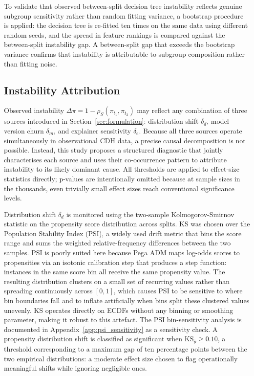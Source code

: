 \documentclass[oneside]{memoir} %
\begin{document}
To validate that observed between-split decision tree instability reflects genuine subgroup sensitivity rather than random fitting variance, a bootstrap procedure is applied: the decision tree is re-fitted ten times on the same data using different random seeds, and the spread in feature rankings is compared against the between-split instability gap. A between-split gap that exceeds the bootstrap variance confirms that instability is attributable to subgroup composition rather than fitting noise.

\subsection{Instability Attribution}

Observed instability $\Delta\pi = 1 - \rho_S(\pi_{t_1}, \pi_{t_2})$ may reflect any combination of three sources introduced in Section~\ref{sec:formulation}: distribution shift $\delta_d$, model version churn $\delta_m$, and explainer sensitivity $\delta_e$. Because all three sources operate simultaneously in observational CDH data, a precise causal decomposition is not possible. Instead, this study proposes a structured diagnostic that jointly characterises each source and uses their co-occurrence pattern to attribute instability to its likely dominant cause. All thresholds are applied to effect-size statistics directly; p-values are intentionally omitted because at sample sizes in the thousands, even trivially small effect sizes reach conventional significance levels.

Distribution shift $\delta_d$ is monitored using the two-sample Kolmogorov-Smirnov statistic on the propensity score distribution across splits. KS was chosen over the Population Stability Index (PSI), a widely used drift metric that bins the score range and sums the weighted relative-frequency differences between the two samples. PSI is poorly suited here because Pega ADM maps log-odds scores to propensities via an isotonic calibration step that produces a step function: instances in the same score bin all receive the same propensity value. The resulting distribution clusters on a small set of recurring values rather than spreading continuously across $[0, 1]$, which causes PSI to be sensitive to where bin boundaries fall and to inflate artificially when bins split these clustered values unevenly. KS operates directly on ECDFs without any binning or smoothing parameter, making it robust to this artefact. The PSI bin-sensitivity analysis is documented in Appendix~\ref{app:psi_sensitivity} as a sensitivity check. A propensity distribution shift is classified as significant when $\text{KS}_{\hat{p}} \geq 0.10$, a threshold corresponding to a maximum gap of ten percentage points between the two empirical distributions: a moderate effect size chosen to flag operationally meaningful shifts while ignoring negligible ones.
\end{document}
